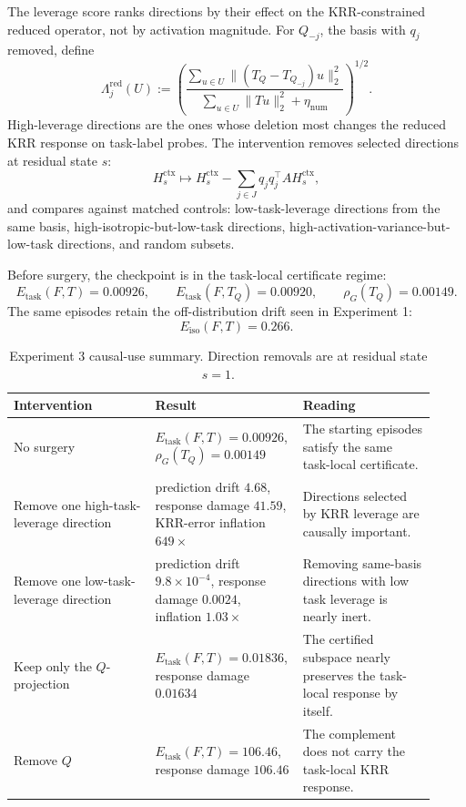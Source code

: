 \documentclass[11pt]{article}
\begin{document}
The leverage score ranks directions by their effect on the KRR-constrained reduced operator, not by
activation magnitude. For \(Q_{-j}\), the basis with \(q_j\) removed, define
\[
\Lambda_j^{\mathrm{red}}(U)
:=
\left(
\frac{
\sum_{u\in U}\|(T_Q-T_{Q_{-j}})u\|_2^2
}{
\sum_{u\in U}\|Tu\|_2^2+\eta_{\mathrm{num}}
}
\right)^{1/2}.
\]
High-leverage directions are the ones whose deletion most changes the reduced KRR response on
task-label probes. The intervention removes selected directions at residual state \(s\):
\[
H_s^{\mathrm{ctx}}
\longmapsto
H_s^{\mathrm{ctx}}
-
\sum_{j\in J}q_jq_j^\top A H_s^{\mathrm{ctx}},
\]
and compares against matched controls: low-task-leverage directions from the same basis,
high-isotropic-but-low-task directions, high-activation-variance-but-low-task directions, and random
subsets.

Before surgery, the checkpoint is in the task-local certificate regime:
\[
E_{\mathrm{task}}(F,T)=0.00926,
\qquad
E_{\mathrm{task}}(F,T_Q)=0.00920,
\qquad
\rho_G(T_Q)=0.00149.
\]
The same episodes retain the off-distribution drift seen in Experiment 1:
\[
E_{\mathrm{iso}}(F,T)=0.266.
\]

\begin{table}[htbp]
\centering
\caption{Experiment 3 causal-use summary. Direction removals are at residual state \(s=1\).}
\small
\setlength{\tabcolsep}{4pt}
\begin{tabular}{@{}p{0.32\linewidth}p{0.30\linewidth}p{0.30\linewidth}@{}}
\toprule
Intervention & Result & Reading\\
\midrule
No surgery &
\(E_{\mathrm{task}}(F,T)=0.00926\), \(\rho_G(T_Q)=0.00149\) &
The starting episodes satisfy the same task-local certificate.\\
Remove one high-task-leverage direction &
prediction drift \(4.68\), response damage \(41.59\), KRR-error inflation \(649\times\) &
Directions selected by KRR leverage are causally important.\\
Remove one low-task-leverage direction &
prediction drift \(9.8\times10^{-4}\), response damage \(0.0024\), inflation \(1.03\times\) &
Removing same-basis directions with low task leverage is nearly inert.\\
Keep only the \(Q\)-projection &
\(E_{\mathrm{task}}(F,T)=0.01836\), response damage \(0.01634\) &
The certified subspace nearly preserves the task-local response by itself.\\
Remove \(Q\) &
\(E_{\mathrm{task}}(F,T)=106.46\), response damage \(106.46\) &
The complement does not carry the task-local KRR response.\\
\bottomrule
\end{tabular}
\end{table}
\end{document}
